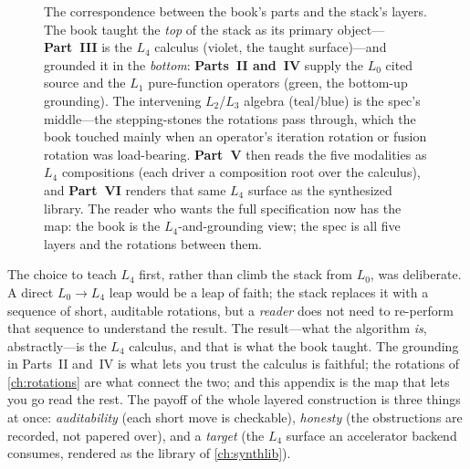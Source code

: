 \begin{figure}[t]
\begin{tikzpicture}[font=\footnotesize, >=Stealth, node distance=0mm]
\end{tikzpicture}
\caption[How the book's parts map onto the layers]{The correspondence between the
book's parts and the stack's layers. The book taught the \emph{top} of the stack as its
primary object---\textbf{Part~III} is the $L_4$ calculus (violet, the taught
surface)---and grounded it in the \emph{bottom}: \textbf{Parts~II and~IV} supply the
$L_0$ cited source and the $L_1$ pure-function operators (green, the bottom-up
grounding). The intervening $L_2$/$L_3$ algebra (teal/blue) is the spec's middle---the
stepping-stones the rotations pass through, which the book touched mainly when an
operator's iteration rotation or fusion rotation was load-bearing. \textbf{Part~V} then
reads the five modalities as $L_4$ compositions (each driver a composition root over
the calculus), and \textbf{Part~VI} renders that same $L_4$ surface as the synthesized
library. The reader who wants the full specification now has the map: the book is the
$L_4$-and-grounding view; the spec is all five layers and the rotations between them.}
\label{fig:partsmap}
\end{figure}

The choice to teach $L_4$ first, rather than climb the stack from $L_0$, was
deliberate. A direct $L_0\!\to\!L_4$ leap would be a leap of faith; the stack replaces
it with a sequence of short, auditable rotations, but a \emph{reader} does not need to
re-perform that sequence to understand the result. The result---what the algorithm
\emph{is}, abstractly---is the $L_4$ calculus, and that is what the book taught. The
grounding in Parts~II and~IV is what lets you trust the calculus is faithful; the
rotations of \cref{ch:rotations} are what connect the two; and this appendix is the map
that lets you go read the rest. The payoff of the whole layered construction is three
things at once: \emph{auditability} (each short move is checkable), \emph{honesty} (the
obstructions are recorded, not papered over), and a \emph{target} (the $L_4$ surface an
accelerator backend consumes, rendered as the library of \cref{ch:synthlib}).

